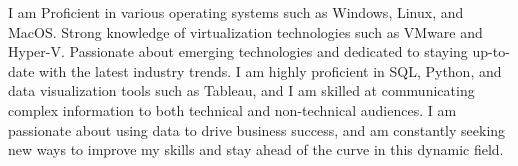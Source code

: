 \documentclass[11 pt,oneside,a4paper,titlepage]{article}
\begin{document}
{\begin{minipage}{7.3cm}
       I am Proficient in various operating systems such as Windows, Linux, and MacOS. Strong knowledge of virtualization technologies such as VMware and Hyper-V. Passionate about emerging technologies and dedicated to staying up-to-date with the latest industry trends. I am highly proficient in SQL, Python, and data visualization tools such as Tableau, and I am skilled at communicating complex information to both technical and non-technical audiences. I am passionate about using data to drive business success, and am constantly seeking new ways to improve my skills and stay ahead of the curve in this dynamic field.
        

\end{minipage}}
\end{document}

